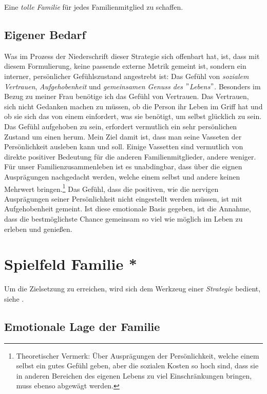 Eine \textit{tolle Familie} für jedes Familienmitglied zu schaffen.\\

\subsection{Eigener Bedarf}


Was im Prozess der Niederschrift dieser Strategie sich offenbart hat, ist, dass mit diesem Formulierung, keine passende externe Metrik gemeint ist, sondern ein interner, persönlicher Gefühlszustand angestrebt ist: Das Gefühl von 
\textit{sozialem Vertrauen},
 \textit{Aufgehobenheit}
  und \textit{gemeinsamen Genuss des $"$Lebens$"$}. 
Besonders im Bezug zu meiner Frau benötige ich das Gefühl von Vertrauen. Das Vertrauen, sich nicht Gedanken machen zu müssen, ob die Person ihr Leben im Griff hat und ob sie sich das von einem einfordert, was sie benötigt, um selbst glücklich zu sein. Das Gefühl aufgehoben zu sein, erfordert vermutlich ein sehr persönlichen Zustand um einen herum. Mein Ziel damit ist, dass man seine Vasseten der Persönlichkeit ausleben kann und soll. Einige Vassetten sind vermutlich von direkte positiver Bedeutung für die anderen Familienmitglieder, andere weniger. Für unser Familienzusammenleben ist es unabdingbar, dass über die eignen Ausprägungen nachgedacht werden, welche einem selbst und andere keinen Mehrwert bringen.\footnote{
	Theoretischer Vermerk: Über Ausprägungen der Persönlichkeit, welche einem selbst ein gutes Gefühl geben, aber die sozialen Kosten so hoch sind, dass sie in anderen Bereichen des eigenen Lebens zu viel Einschränkungen bringen, muss ebenso abgewägt werden.
} Das Gefühl, dass die positiven, wie die nervigen Ausprägungen seiner Persönlichkeit nicht eingestellt werden müssen, ist mit Aufgehobenheit gemeint. Ist diese emotionale Basis gegeben, ist die Annahme, dass die bestmöglichste Chance gemeinsam so viel wie möglich im Leben zu erleben und genießen.

\section{Spielfeld Familie *}
Um die Zielsetzung zu erreichen, wird sich dem Werkzeug einer \textit{Strategie} bedient, siehe .

\subsection{Emotionale Lage der Familie}

